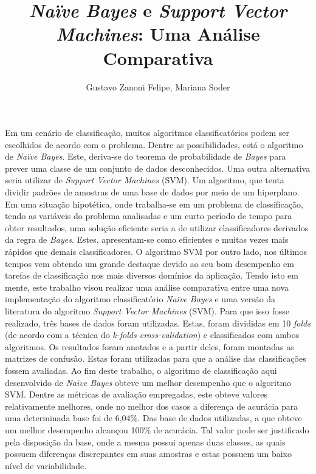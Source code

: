 \documentclass[12pt]{article}
\title{\textit{Naïve Bayes} e \textit{Support Vector Machines}: Uma Análise Comparativa}
\author{Gustavo Zanoni Felipe\inst{1}, Mariana Soder\inst{1}}
\begin{document}
 

\maketitle
     
\begin{resumo} 
    Em um cenário de classificação, muitos algoritmos classificatórios podem ser escolhidos de acordo com o problema. Dentre as possibilidades, está o algoritmo de \textit{Naïve Bayes}. Este, deriva-se do teorema de probabilidade de \textit{Bayes} para prever uma classe de um conjunto de dados desconhecidos. Uma outra alternativa seria utilizar de \textit{Support Vector Machines} (SVM). Um algoritmo, que tenta dividir padrões de amostras de uma base de dados por meio de um hiperplano. Em uma situação hipotética, onde trabalha-se em um problema de classificação, tendo as variáveis do problema analisadas e um curto período de tempo para obter resultados, uma solução eficiente seria a de utilizar classificadores derivados da regra de \textit{Bayes}. Estes, apresentam-se como eficientes e muitas vezes mais rápidos que demais classificadores. O algoritmo SVM por outro lado, nos últimos tempos vem obtendo um grande destaque devido ao seu bom desempenho em tarefas de classificação nos mais diversos domínios da aplicação. Tendo isto em mente, este trabalho visou realizar uma análise comparativa entre uma nova implementação do algoritmo classificatório \textit{Naïve Bayes} e uma versão da literatura do algoritmo \textit{Support Vector Machines} (SVM). Para que isso fosse realizado, três bases de dados foram utilizadas. Estas, foram divididas em 10 \textit{folds} (de acordo com a técnica do \textit{k-folds cross-validation}) e classificados com ambos algoritmos. Os resultados foram anotados e a partir deles, foram montadas as matrizes de confusão. Estas foram utilizadas para que a análise das classificações fossem avaliadas. Ao fim deste trabalho, o algoritmo de classificação aqui desenvolvido de \textit{Naïve Bayes} obteve um melhor desempenho que o algoritmo SVM. Dentre as métricas de avaliação empregadas, este obteve valores relativamente melhores, onde no melhor dos casos a diferença de acurácia para uma determinada base foi de 6,04\%. Das base de dados utilizadas, a que obteve um melhor desempenho alcançou 100\% de acurácia. Tal valor pode ser justificado pela disposição da base, onde a mesma possui apenas duas classes, as quais possuem diferenças discrepantes em suas amostras e estas possuem um baixo nível de variabilidade.
\end{resumo}
\end{document}
